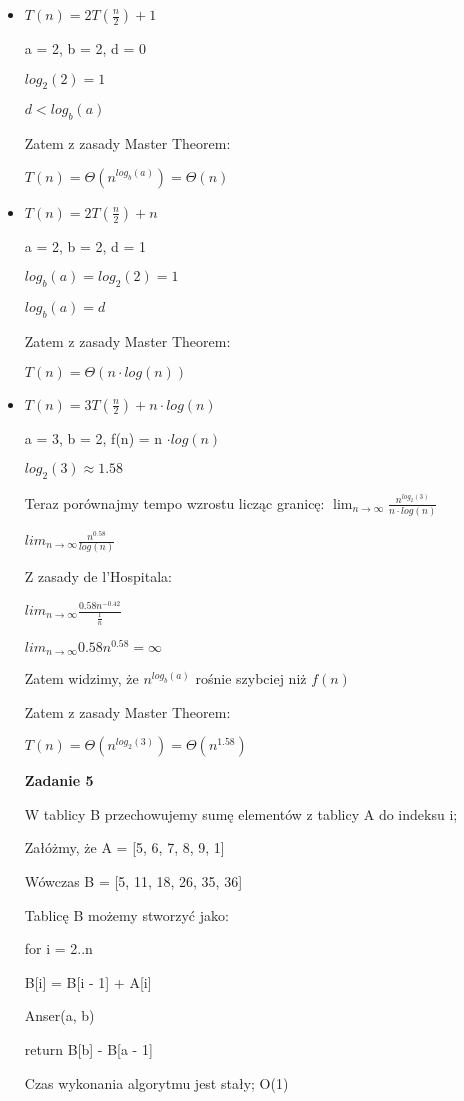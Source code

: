 \documentclass{article}
\begin{document}
    \begin{itemize}
        \item $T(n) = 2T(\frac{n}{2}) + 1$ \par
        a = 2, b = 2, d = 0 \par
        $log_2(2) = 1$ \par
        $d < log_b(a)$ \par
        Zatem z zasady Master Theorem: \par
        $T(n) = \Theta(n^{log_b(a)}) = \Theta(n)$ \par
        \item $T(n) = 2T(\frac{n}{2}) + n$ \par
        a = 2, b = 2, d = 1 \par
        $log_b(a) = log_2(2) = 1$ \par
        $log_b(a) = d$ \par
        Zatem z zasady Master Theorem: \par
        $T(n) = \Theta(n \cdot log(n))$ \par
        \item $T(n) = 3T(\frac{n}{2}) + n \cdot log(n)$ \par
        a = 3, b = 2, f(n) = n $\cdot log(n)$ \par
        $log_2(3) \approx 1.58$ \par
        Teraz porównajmy tempo wzrostu licząc granicę: $\lim_{n \to \infty} \frac{n^{log_2(3)}}{n \cdot log(n)}$ \par
        $lim_{n \to \infty} \frac{n^{0.58}}{log(n)}$ \par
        Z zasady de l'Hospitala: \par
        $lim_{n \to \infty} \frac{0.58n^{-0.42}}{\frac{1}{n}}$ \par
        $lim_{n \to \infty} 0.58n^{0.58} = \infty$ \par
        Zatem widzimy, że $n^{log_b(a)}$ rośnie szybciej niż $f(n)$ \par
        Zatem z zasady Master Theorem: \par
        $T(n) = \Theta(n^{log_2(3)}) = \Theta(n^{1.58})$ \par

        \vspace{14\baselineskip}
        \textbf{Zadanie 5} \par
        W tablicy B przechowujemy sumę elementów z tablicy A do indeksu i; \par
        Załóżmy, że A = [5, 6, 7, 8, 9, 1] \par
        Wówczas B = [5, 11, 18, 26, 35, 36] \par
        Tablicę B możemy stworzyć jako: \par
        for i = 2..n { \par
            B[i] = B[i - 1] + A[i] \par
        } \par
        Anser(a, b) { \par
            return B[b] - B[a - 1] \par
        } \par
        Czas wykonania algorytmu jest stały; O(1) \par
        

\end{itemize}
\end{document}
